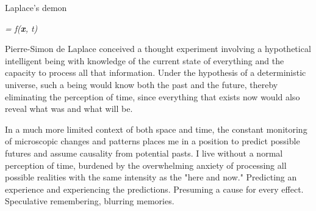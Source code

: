 

\begin{center}
\vspace*{\fill}
\Huge{Laplace's demon}

\vspace{2cm}

\begin{flushright}
\large{
\textit{  = f(\textbf{x}, t) } }
\end{flushright}

\vspace*{\fill}
\end{center}


Pierre-Simon de Laplace conceived a thought experiment involving a hypothetical intelligent being with knowledge of the current state of everything and the capacity to process all that information. Under the hypothesis of a deterministic universe, such a being would know both the past and the future, thereby eliminating the perception of time, since everything that exists now would also reveal what was and what will be.

In a much more limited context of both space and time, the constant monitoring of microscopic changes and patterns places me in a position to predict possible futures and assume causality from potential pasts. I live without a normal perception of time, burdened by the overwhelming anxiety of processing all possible realities with the same intensity as the "here and now." Predicting an experience and experiencing the predictions. Presuming a cause for every effect. Speculative remembering, blurring memories.
